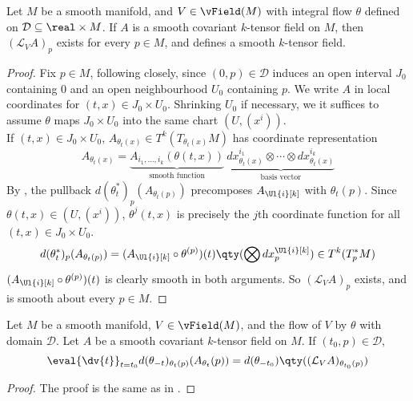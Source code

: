 \documentclass[../main-v2-manifolds.tex]{subfiles}
\begin{document}
\begin{wts}
    Let $M$ be a smooth manifold, and $V\in \vField(M)$ with integral flow $\theta$ defined on $\mathcal{D}\subseteq\real\times M$. If $A$ is a smooth covariant $k$-tensor field on $M$, then $(\mathcal{L}_V A)_p$ exists for every $p\in M$, and defines a smooth $k$-tensor field.
\end{wts}
\begin{proof}
    Fix $p\in M$, following  closely, since $(0,p)\in\mathcal{D}$ induces an open interval $J_0$ containing $0$ and an open neighbourhood $U_0$ containing $p$. We write $A$ in local coordinates for $(t,x)\in J_0\times U_0$. Shrinking $U_0$ if necessary, we it suffices to assume $\theta$ maps $J_0\times U_0$ into the same chart $(U,(x^i))$.\\

    If $(t,x)\in J_0\times U_0$, $A_{\theta_t(x)}\in T^k(T_{\theta_t(x)}M)$ has coordinate representation
    \[
        A_{\theta_t(x)} = \underbrace{A_{i_1,\ldots, i_k}(\theta(t,x))}_{\text{smooth function}}\: \underbrace{dx^{i_1}_{\theta_t(x)}\otimes\cdots\otimes dx^{i_k}_{\theta_t(x)}}_{\text{basis vector}}
    \]
    By , the pullback $d(\theta^*_t)_{p}(A_{\theta_t(p)})$ precomposes $A_{\Ul{i}[k]}$ with $\theta_{t}(p)$. Since $\theta(t,x)\in (U,(x^i))$, $\theta^j(t,x)$ is precisely the $j$th coordinate function for all $(t,x)\in J_0\times U_0$.
    \[
        d(\theta^*_t)_{p}(A_{\theta_t(p)}) = (A_{\Ul{i}[k]}\circ \theta^{(p)}) (t)\qty(\bigotimes dx_{p}^{\Ul{i}[k]})\in T^k(T^*_pM)
    \]
    $(A_{\Ul{i}[k]}\circ \theta^{(p)}) (t)$ is clearly smooth in both arguments. So $(\mathcal{L}_V A)_p$ exists, and is smooth about every $p\in M$.
\end{proof}

\begin{wts}
    Let $M$ be a smooth manifold, $V\in\vField(M)$, and the flow of $V$ by $\theta$ with domain $\mathcal{D}$. Let $A$ be a smooth covariant $k$-tensor field on $M$. If $(t_0, p)\in \mathcal{D}$,
    \[
        \eval{\dv{t}}_{t=t_0} d(\theta_{-t})_{\theta_t(p)}(A_{\theta_t}(p)) = d(\theta_{-t_0})\qty((\mathcal{L}_V A)_{\theta_{t_0}(p)})
    \]
\end{wts}
\begin{proof}
    The proof is the same as in .
\end{proof}
\end{document}
